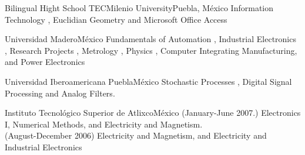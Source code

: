 \documentclass[10pt,a4paper,roman]{moderncv}
\begin{document}
{Bilingual Hight School TECMilenio University}{Puebla, M\'exico}{}
{
Information Technology \href{https://sites.google.com/site/perezxochicale/teaching/iit}{\faExternalLink},
Euclidian Geometry  \href{https://sites.google.com/site/perezxochicale/teaching/euclidean-geometry}{\faExternalLink}
and
Microsoft Office Access \href{https://sites.google.com/site/perezxochicale/teaching/moa}{\faExternalLink}
}

{Universidad Madero}{M\'exico}{}
{Fundamentals of Automation
\href{https://sites.google.com/site/perezxochicale/digital-electronics}{\faExternalLink},
Industrial Electronics \href{https://sites.google.com/site/perezxochicale/ie}{\faExternalLink},
Research Projects \href{https://sites.google.com/site/perezxochicale/latex/thesistemplate}{\faExternalLink},
Metrology \href{https://sites.google.com/site/perezxochicale/metrology}{\faExternalLink},
Physics \href{http://goo.gl/fffnG}{\faExternalLink},
Computer Integrating Manufacturing, and Power Electronics
}

{Universidad Iberoamericana Puebla}{M\'exico}{}
{Stochastic Processes 
\href{https://sites.google.com/site/perezxochicale/stochastic-processes-course}{\faExternalLink},
Digital Signal Processing
\href{https://sites.google.com/site/perezxochicale/digital-signal-processing-course}{\faExternalLink}
and Analog Filters.
}

{Instituto Tecnol\'ogico Superior de Atlixco}{M\'exico}{}
{
(January-June 2007.) Electronics I, Numerical Methods, and Electricity and Magnetism. \\ 
(August-December 2006) Electricity and Magnetism, and Electricity and Industrial Electronics 
}



\vspace{20mm}

\end{document}
